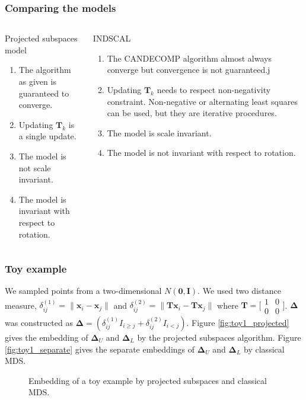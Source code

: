 \documentclass[professionalfonts,hyperref={pdfpagelabels=false,colorlinks=true,linkcolor=cyan}]{beamer}
\begin{document}
\begin{frame}
 \frametitle{Comparing the models}
  \begin{columns}[t]
  \begin{column}{0.5\textwidth}
    Projected subspaces model
    \begin{enumerate}
    \item The algorithm as given is guaranteed to converge.
    \item Updating $\mathbf{T}_k$ is a single update.
    \item The model is \alert{not} scale invariant.
    \item The model is invariant with respect to rotation.
    \end{enumerate}
  \end{column}
  
  \begin{column}{0.5\textwidth}
    INDSCAL
    \begin{enumerate}
    \item The CANDECOMP algorithm almost always converge but
      convergence is not guaranteed.j
    \item Updating $\mathbf{T}_k$ needs to respect non-negativity
      constraint. Non-negative or alternating least squares can be
      used, but they are iterative procedures. 
    \item The model is scale invariant.
    \item The model is \alert{not} invariant with respect to rotation.
    \end{enumerate}
  \end{column}
\end{columns}
\end{frame}

\begin{frame}
  \frametitle{Toy example}
  We sampled points from a two-dimensional $N(\mathbf{0},
  \mathbf{I})$. We used two distance measure,
  $\delta_{ij}^{(1)} = \| \mathbf{x}_i - \mathbf{x}_j \|$ and
  $\delta_{ij}^{(2)} = \| \mathbf{T}\mathbf{x}_i - \mathbf{T}
  \mathbf{x}_j \|$ where $\mathbf{T} =
  \bigl[\begin{smallmatrix} 1 & 0 \\ 0 & 0 \end{smallmatrix}
  \bigr]$. $\bm{\Delta}$ was constructed as $\bm{\Delta} =
  (\delta_{ij}^{(1)}I_{i \geq j} + \delta_{ij}^{(2)} I_{i <
    j})$. Figure \ref{fig:toy1_projected} gives the embedding of
  $\bm{\Delta}_U$ and $\bm{\Delta}_L$ by the projected subspaces
  algorithm. Figure \ref{fig:toy1_separate} gives the separate
  embeddings of $\bm{\Delta}_U$ and $\bm{\Delta}_L$ by classical MDS. 
  \begin{figure}[htbp]
  \subfiglabelskip=10pt
    \centering
    \caption{Embedding of a toy example by projected subspaces and
      classical MDS.}
    \label{fig:toy_dge}
  \end{figure}
\end{frame}
\end{document}
